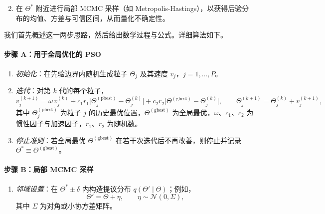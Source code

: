 \documentclass[11pt,a4paper,fontset=windows]{ctexart}
\begin{document}
\begin{enumerate}\setcounter{enumi}{1}
\item 在 $\Theta^{*}$ 附近进行局部 MCMC 采样（如 Metropolis-Hastings），以获得后验分布的均值、方差与可信区间，从而量化不确定性。
\end{enumerate}

我们首先概述这一两步思路，然后给出数学过程与公式。详细算法如下。

\paragraph*{步骤 A：用于全局优化的 PSO}
\begin{enumerate}
\item \textit{初始化}：在先验边界内随机生成粒子 $\Theta_j$ 及其速度 $v_j$，$j=1,\dots,P$。
\item \textit{迭代}：对第 $k$ 代的每个粒子，
\[
v_j^{(k+1)}=\omega\,v_j^{(k)}+c_1r_1\bigl[\Theta_j^{(\text{pbest})}-\Theta_j^{(k)}\bigr]
+c_2r_2\bigl[\Theta^{(\text{gbest})}-\Theta_j^{(k)}\bigr],
\qquad
\Theta_j^{(k+1)}=\Theta_j^{(k)}+v_j^{(k+1)},
\]
其中 $\Theta_j^{(\text{pbest})}$ 为粒子 $j$ 的历史最优位置，$\Theta^{(\text{gbest})}$ 为全局最优，$\omega$、$c_1$、$c_2$ 为惯性因子与加速因子，$r_1$、$r_2$ 为随机数。
\item \textit{停止准则}：若全局最优 $\Theta^{(\text{gbest})}$ 在若干次迭代后不再改善，则停止并记录 $\Theta^{*}\equiv\Theta^{(\text{gbest})}$。
\end{enumerate}

\paragraph*{步骤 B：局部 MCMC 采样}
\begin{enumerate}
\item \textit{邻域设置}：在 $\Theta^{*}\pm\delta$ 内构造提议分布 $q(\Theta'\mid\Theta)$；例如，
\[
\Theta'=\Theta+\eta,\qquad \eta\sim\mathcal{N}(0,\Sigma),
\]
其中 $\Sigma$ 为对角或小协方差矩阵。
\end{enumerate}
\end{document}
